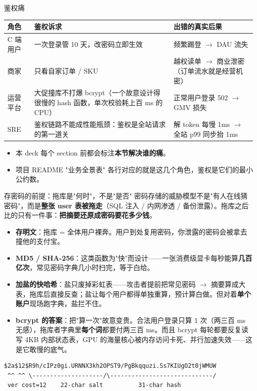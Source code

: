 \documentclass[aspectratio=169,11pt]{beamer}
\begin{document}
\begin{frame}[shrink]{鉴权痛}
\begin{tabular}{@{}lp{6.2cm}p{4.4cm}@{}}
\toprule
角色 & 鉴权诉求 & 出错的真实后果 \\
\midrule
C 端用户   & 一次登录管 10 天，改密码立即生效 & 频繁踢登 \(\to\) DAU 流失 \\
商家       & 只看自家订单 / SKU              & 越权读单 \(\to\) 商业泄密（订单流水就是经营机密）\\
运营平台   & 大促撞库不打爆 bcrypt（一个故意设计得很慢的 hash 函数，单次校验耗上百 ms 的 CPU） & 正常用户登录 502 \(\to\) GMV 损失 \\
SRE       & 鉴权链路不能成性能瓶颈：鉴权是全站请求的第一道关 & 解 token 每慢 1ms \(\to\) 全站 p99 同步抬 1ms \\
\bottomrule
\end{tabular}
\vspace{2mm}
\begin{itemize}
  \item 本 deck 每个 section 前都会标注\textbf{本节解决谁的痛}。
  \item 项目 README "业务全景表" 各行对应的就是这几个角色，鉴权是它们的最小公约数。
\end{itemize}
\end{frame}

\begin{frame}{存密码的前提：拖库是"何时"，不是"是否"}
密码存储的威胁模型不是"有人在线猜密码"，而是\textbf{整张 user 表被拖走}（SQL 注入 / 内网渗透 / 备份泄露）。拖库之后比的只有一件事：\textbf{把摘要还原成密码要花多少钱}。
\begin{itemize}\scriptsize
  \item \textbf{存明文}：拖库 = 全体用户裸奔。用户到处复用密码，你泄露的密码会被拿去撞他的支付宝。
  \item \textbf{MD5 / SHA-256}：这类函数为"快"而设计——一张消费级显卡每秒能算\textbf{几百亿次}，常见密码字典几小时扫完，等于白给。
  \item \textbf{加盐的快哈希}：盐只废掉彩虹表——攻击者提前把常见密码 \(\to\) 摘要算成大表，拖库后直接反查；盐让每个用户都得单独重算，预计算白做。但对着\textbf{单个账户}现场跑字典，盐拦不住。
  \item \textbf{bcrypt 的答案}：把"算一次"故意变贵。合法用户登录只算 1 次（两三百 ms 无感），拖库者字典里\textbf{每个词}都要付两三百 ms。而且 bcrypt 每轮都要反复读写 4KB 内部状态表，GPU 的海量核心被内存访问卡死、并行加速失效——这是它敢慢的底气。
\end{itemize}
\begin{lstlisting}[basicstyle=\scriptsize\ttfamily]
$2a$12$R9h/cIPz0gi.URNNX3kh2OPST9/PgBkqquzi.Ss7KIUgO2t0jWMUW
 ^^ ^^ \--------------------/\-----------------------------/
 ver cost=12    22-char salt          31-char hash
\end{lstlisting}
\end{frame}
\end{document}
